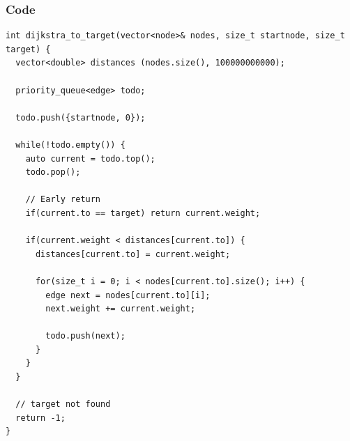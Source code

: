 \begin{frame}[fragile]
\frametitle{Code}
\begin{lstlisting}[basicstyle=\tiny]
int dijkstra_to_target(vector<node>& nodes, size_t startnode, size_t target) {
  vector<double> distances (nodes.size(), 100000000000);

  priority_queue<edge> todo;

  todo.push({startnode, 0});
  
  while(!todo.empty()) {
    auto current = todo.top();
    todo.pop();

    // Early return
    if(current.to == target) return current.weight;

    if(current.weight < distances[current.to]) {
      distances[current.to] = current.weight;

      for(size_t i = 0; i < nodes[current.to].size(); i++) {
        edge next = nodes[current.to][i];
        next.weight += current.weight;

        todo.push(next);
      }
    }
  }

  // target not found
  return -1;
}
\end{lstlisting}

\end{frame}